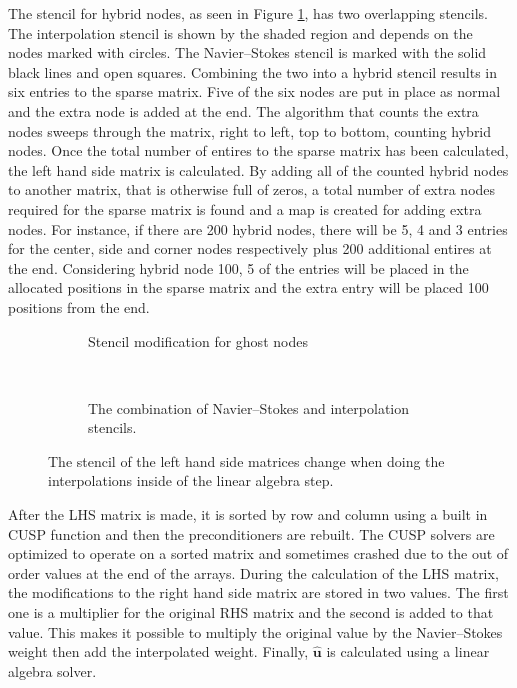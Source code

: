 \documentclass[onehalf,11pt]{beavtex}
\begin{document}
The stencil for hybrid nodes, as seen in Figure \ref{fig:ID combined stencil}, has two overlapping stencils.
The interpolation stencil is shown by the shaded region and depends on the nodes marked with circles.
The Navier--Stokes stencil is marked with the solid black lines and open squares.
Combining the two into a hybrid stencil results in six entries to the sparse matrix.
Five of the six nodes are put in place as normal and the extra node is added at the end. 
The algorithm that counts the extra nodes sweeps through the matrix, right to left, top to bottom, counting hybrid nodes.
Once the total number of entires to the sparse matrix has been calculated, the left hand side matrix is calculated.
By adding all of the counted hybrid nodes to another matrix, that is otherwise full of zeros, a total number of extra nodes required for the sparse matrix is found and a map is created for adding extra nodes.
For instance, if there are 200 hybrid nodes, there will be 5, 4 and 3 entries for the center, side and corner nodes respectively plus 200 additional entires at the end.
Considering hybrid node 100, 5 of the entries will be placed in the allocated positions in the sparse matrix and the extra entry will be placed 100 positions from the end.

\begin{figure}[htb]
	\centering
	\begin{subfigure}{0.4\textwidth}
			
			\caption{Stencil modification for ghost nodes}		
	\end{subfigure}
	~
	\begin{subfigure}{0.4\textwidth}
		
		\caption{The combination of Navier--Stokes and interpolation stencils.}		
	\end{subfigure}
	\caption{The stencil of the left hand side matrices change when doing the interpolations inside of the linear algebra step.}
	\label{fig:ID combined stencil}
\end{figure}

After the LHS matrix is made, it is sorted by row and column using a built in CUSP function and then the preconditioners are rebuilt.
The CUSP solvers are optimized to operate on a sorted matrix and sometimes crashed due to the out of order values at the end of the arrays.
During the calculation of the LHS matrix, the modifications to the right hand side matrix are stored in two values.
The first one is a multiplier for the original RHS matrix and the second is added to that value.
This makes it possible to multiply the original value by the Navier--Stokes weight then add the interpolated weight.
Finally, $\hat{\textbf{u}}$ is calculated using a linear algebra solver.
\end{document}
